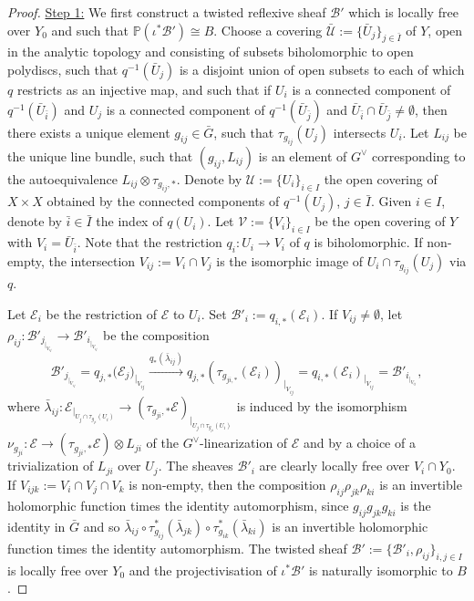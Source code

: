 \documentclass[12pt]{amsart}
\numberwithin{equation}{subsection}
\theoremstyle{plain}
\theoremstyle{definition}
\newcommand{\B}{{\mathcal B}}
\newcommand{\E}{{\mathcal E}}
\newcommand{\U}{{\mathcal U}}
\newcommand{\V}{{\mathcal V}}
\newcommand{\PP}{{\mathbb P}}
\newcommand{\RightArrowOf}[1]{\stackrel{#1}{\rightarrow}}
\newcommand{\restricted}[2]{#1_{\mid_{#2}}}
\begin{document}
\begin{proof}
\underline{Step 1:} We first construct a twisted reflexive sheaf $\B'$ which is locally free over $Y_0$ and such that 
$\PP(\iota^*\B')\cong B$. Choose a covering $\bar{\U}:=\{\bar{U}_j\}_{j\in \bar{I}}$ of $Y$, open in the analytic topology and consisting of subsets biholomorphic to open polydiscs, such that $q^{-1}(\bar{U}_j)$
is a disjoint union of open subsets to each of which $q$ restricts as an injective map, and such that if $U_i$ is a connected component of $q^{-1}(\bar{U}_{\bar{i}})$ and
$U_j$ is a connected component of $q^{-1}(\bar{U}_{\bar{j}})$ and $\bar{U}_{\bar{i}}\cap \bar{U}_{\bar{j}}\neq \emptyset$, then there exists a unique element $g_{ij}\in\bar{G}$, such that $\tau_{g_{ij}}(U_j)$ intersects $U_i$.
Let $L_{ij}$ be the unique line bundle, such that $(g_{ij},L_{ij})$ is an element of $G^\vee$ corresponding to the autoequivalence $L_{ij}\otimes\tau_{g_{ij},*}$.
Denote by $\U:=\{U_i\}_{i\in I}$ the open covering of $X\times X$ obtained by the connected components of $q^{-1}(U_j)$, $j\in\bar{I}$. Given $i\in I$, denote by $\bar{i}\in\bar{I}$ the index of $q(U_i)$. Let $\V:=\{V_i\}_{i\in I}$ be the open covering of $Y$ with $V_i=\bar{U}_{\bar{i}}$. Note that the restriction $q_i:U_i\rightarrow V_i$ of $q$ is biholomorphic. If non-empty, the intersection  $V_{ij}:=V_i\cap V_j$ is the isomorphic image of $U_i\cap \tau_{g_{ij}}(U_j)$ via $q$.

Let $\E_i$ be the restriction of $\E$ to $U_i$. Set $\B'_i:=q_{i,*}(\E_i)$. If $V_{ij}\neq\emptyset$, let
$
\rho_{ij}:\B'_{\restricted{j}{V_{ij}}}\rightarrow \B'_{\restricted{i}{V_{ij}}}
$
be the composition
\[
\B'_{\restricted{j}{V_{ij}}}=
q_{j,*}(\E_j{\restricted{)}{V_{ij}}}\RightArrowOf{q_*(\bar{\lambda}_{ij})}
q_{j,*}(\tau_{g_{ji,*}}(\E_i)\restricted{)}{V_{ij}}=
q_{i,*}(\E_i\restricted{)}{V_{ij}}=
\B'_{\restricted{i}{V_{ij}}}, 
\]
where 
$\bar{\lambda}_{ij}:\restricted{\E}{U_j\cap\tau_{g_{ji}}(U_i)}\rightarrow (\tau_{g_{ji},*}\E\restricted{)}{U_j\cap\tau_{g_{ji}}(U_i)}$ is induced by the 
isomorphism $\nu_{g_{ji}}:\E\rightarrow (\tau_{g_{ji},*}\E)\otimes L_{ji}$ of the 
$G^\vee$-linearization 
of $\E$ and by a choice of a trivialization of $L_{ji}$ over $U_j$. The sheaves $\B'_i$ are clearly locally free over $V_i\cap Y_0$. If $V_{ijk}:=V_i\cap V_j\cap V_k$ is non-empty, then 
the composition $\rho_{ij}\rho_{jk}\rho_{ki}$ is an invertible holomorphic function times the identity automorphism, since $g_{ij}g_{jk}g_{ki}$ is the identity in $\bar{G}$ and so $\bar{\lambda}_{ij}\circ\tau_{g_{ij}}^*(\bar{\lambda}_{jk})\circ\tau_{g_{ik}}^*(\bar{\lambda}_{ki})$ is an invertible holomorphic function times the identity automorphism. 
The twisted sheaf $\B':=\{\B'_i,\rho_{ij}\}_{i,j\in I}$ is locally free over $Y_0$ and
the projectivisation of $\iota^*\B'$ is naturally isomorphic to $B$.


\end{proof}
\end{document}
